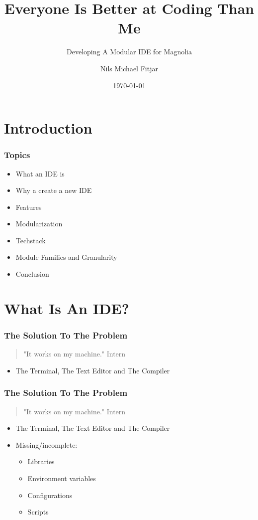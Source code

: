 \documentclass{beamer}
\title{Everyone Is Better at Coding Than Me}
\subtitle{Developing A Modular IDE for Magnolia}
\author{Nils Michael Fitjar}
\institute{University of Bergen}
\date{\today}
\begin{document}
\section{Introduction}

\begin{frame}
    \frametitle{Topics}
    \begin{itemize}
      \item What an IDE is
      \item Why a create a new IDE
      \item Features
      \item Modularization
      \item Techstack
      \item Module Families and Granularity
      \item Conclusion
    \end{itemize}
\end{frame}

\section{What Is An IDE?}
\SectionPage

\begin{frame}
  \frametitle{The Solution To The Problem}
  \begin{quote}
    "It works on my machine." \textemdash Intern
  \end{quote}
  \begin{itemize}
    \item The Terminal, The Text Editor and The Compiler
  \end{itemize}
\end{frame}

\begin{frame}
  \frametitle{The Solution To The Problem}
  \begin{quote}
    "It works on my machine." \textemdash Intern
  \end{quote}
  \begin{itemize}
    \item The Terminal, The Text Editor and The Compiler
    \item Missing/incomplete:
    \begin{itemize}
      \item Libraries
      \item Environment variables
      \item Configurations
      \item Scripts
    \end{itemize}
  \end{itemize}
\end{frame}
\end{document}
